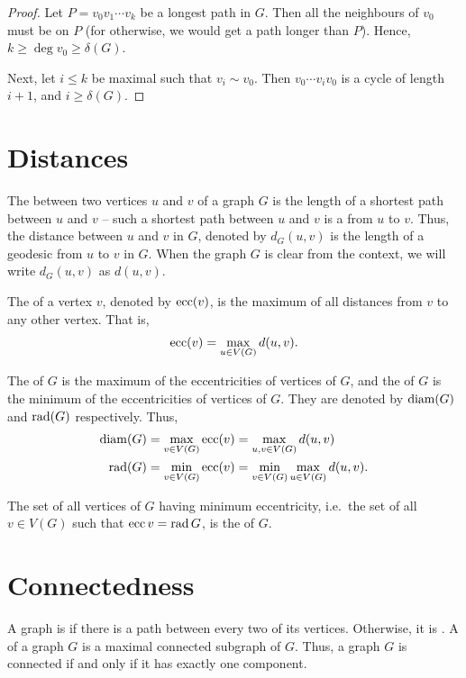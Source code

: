 \begin{proof}
Let $P = v_0 v_1 \cdots v_k$ be a longest path in $G$. Then all the neighbours of $v_0$ must be on $P$ (for otherwise, we would get a path longer than $P$). Hence, $k \ge \deg v_0 \ge \delta(G)$.

Next, let $i \le k$ be maximal such that $v_i \sim v_0$. Then $v_0 \cdots v_i v_0$ is a cycle of length $i + 1$, and $i \ge \delta(G)$.
\end{proof}


\section{Distances}\label{sec:Distances}

The  between two vertices $u$ and $v$ of a graph $G$ is the length of a shortest path between $u$ and $v$ -- such a shortest path between $u$ and $v$ is a  from $u$ to $v$. Thus, the distance between $u$ and $v$ in $G$, denoted by $d_G(u, v)$ is the length of a geodesic from $u$ to $v$ in $G$. When the graph $G$ is clear from the context, we will write $d_G(u, v)$ as $d(u, v)$.

The  of a vertex $v$, denoted by $\operatorname{ecc}(v)$, is the maximum of all distances from $v$ to any other vertex. That is,
\begin{equation*}
    \operatorname{ecc}(v) = \max_{u \in V(G)} d(u, v) .
\end{equation*}

The  of $G$ is the maximum of the eccentricities of vertices of $G$, and the  of $G$ is the minimum of the eccentricities of vertices of $G$. They are denoted by $\operatorname{diam}(G)$ and $\operatorname{rad}(G)$ respectively. Thus,
\begin{align*}
    \operatorname{diam}(G) & = \max_{v \in V(G)} \operatorname{ecc}(v)= \max_{u, v \in V(G)} d(u, v) \\
    \operatorname{rad}(G) & = \min_{v \in V(G)}\operatorname{ecc}(v) = \min_{v \in V(G)} \max_{u \in V(G)} d(u, v).
\end{align*}

The set of all vertices of $G$ having minimum eccentricity, i.e.\ the set of all $v \in V(G)$ such that $\operatorname{ecc} v = \operatorname{rad} G$, is the  of $G$.


\section{Connectedness}\label{sec:Connectedness}

A graph is  if there is a path between every two of its vertices. Otherwise, it is . A  of a graph $G$ is a maximal connected subgraph of $G$. Thus, a graph $G$ is connected if and only if it has exactly one component.

